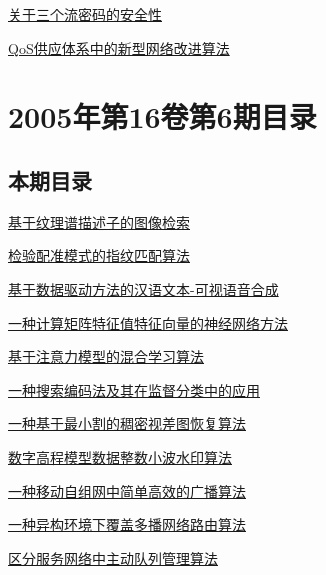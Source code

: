 \documentclass[a4paper]{article}
\begin{document}
\href{http://www.jos.org.cn/ch/reader/download_pdf.aspx?file_no=20050717&year_id=2005&quarter_id=7&falg=1}{关于三个流密码的安全性}

\href{http://www.jos.org.cn/ch/reader/download_pdf.aspx?file_no=20050718&year_id=2005&quarter_id=7&falg=1}{QoS供应体系中的新型网络改进算法}


\section{\textbf{2005年第16卷第6期目录}}
\subsection{本期目录}
\href{http://www.jos.org.cn/ch/reader/download_pdf.aspx?file_no=20050601&year_id=2005&quarter_id=6&falg=1}{基于纹理谱描述子的图像检索}

\href{http://www.jos.org.cn/ch/reader/download_pdf.aspx?file_no=20050602&year_id=2005&quarter_id=6&falg=1}{检验配准模式的指纹匹配算法}

\href{http://www.jos.org.cn/ch/reader/download_pdf.aspx?file_no=20050603&year_id=2005&quarter_id=6&falg=1}{基于数据驱动方法的汉语文本-可视语音合成}

\href{http://www.jos.org.cn/ch/reader/download_pdf.aspx?file_no=20050604&year_id=2005&quarter_id=6&falg=1}{一种计算矩阵特征值特征向量的神经网络方法}

\href{http://www.jos.org.cn/ch/reader/download_pdf.aspx?file_no=20050605&year_id=2005&quarter_id=6&falg=1}{基于注意力模型的混合学习算法}

\href{http://www.jos.org.cn/ch/reader/download_pdf.aspx?file_no=20050606&year_id=2005&quarter_id=6&falg=1}{一种搜索编码法及其在监督分类中的应用}

\href{http://www.jos.org.cn/ch/reader/download_pdf.aspx?file_no=20050607&year_id=2005&quarter_id=6&falg=1}{一种基于最小割的稠密视差图恢复算法}

\href{http://www.jos.org.cn/ch/reader/download_pdf.aspx?file_no=20050608&year_id=2005&quarter_id=6&falg=1}{数字高程模型数据整数小波水印算法}

\href{http://www.jos.org.cn/ch/reader/download_pdf.aspx?file_no=20050609&year_id=2005&quarter_id=6&falg=1}{一种移动自组网中简单高效的广播算法}

\href{http://www.jos.org.cn/ch/reader/download_pdf.aspx?file_no=20050610&year_id=2005&quarter_id=6&falg=1}{一种异构环境下覆盖多播网络路由算法}

\href{http://www.jos.org.cn/ch/reader/download_pdf.aspx?file_no=20050611&year_id=2005&quarter_id=6&falg=1}{区分服务网络中主动队列管理算法}
\end{document}
